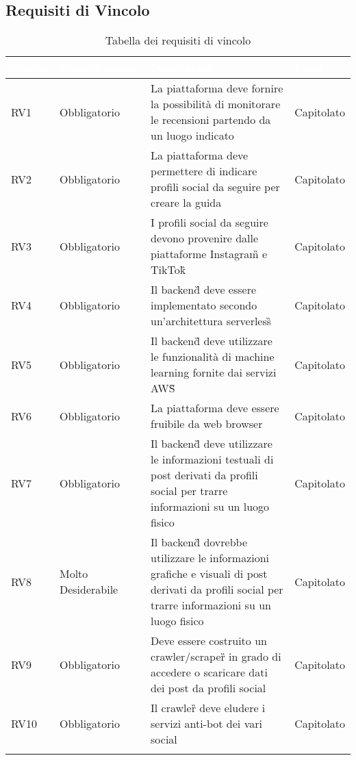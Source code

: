 \subsection{Requisiti di Vincolo}
{
      \setlength{\freewidth}{\dimexpr\textwidth-10\tabcolsep}
      \renewcommand{\arraystretch}{1.5}
      \centering
      \setlength{\aboverulesep}{0pt}
      \setlength{\belowrulesep}{0pt}
      \begin{longtable}{C{.15\freewidth} C{.2\freewidth} C{.528\freewidth} C{.15\freewidth}}
         \toprule
      \textcolor{white}{\textbf{Codice}}&
      \textcolor{white}{\textbf{Classificazione}}&
      \textcolor{white}{\textbf{Descrizione}}&
      \textcolor{white}{\textbf{Fonti}}\\	
      \toprule
      \endhead
      
      RV1 & Obbligatorio & La piattaforma deve fornire la possibilità di monitorare le recensioni partendo da un luogo indicato & Capitolato \\
      RV2 & Obbligatorio & La piattaforma deve permettere di indicare profili social da seguire per creare la guida & Capitolato \\
      RV3 & Obbligatorio & I profili social da seguire devono provenire dalle piattaforme Instagram\G{} e TikTok\G{} & Capitolato \\
      RV4 & Obbligatorio & Il backend\G{} deve essere implementato secondo un'architettura serverless\G{} & Capitolato \\
      RV5 & Obbligatorio & Il backend\G{} deve utilizzare le funzionalità di machine learning fornite dai servizi AWS\G{} & Capitolato \\
      RV6 & Obbligatorio & La piattaforma deve essere fruibile da web browser & Capitolato \\
      RV7 & Obbligatorio & Il backend\G{} deve utilizzare le informazioni testuali di post derivati da profili social per trarre informazioni su un luogo fisico & Capitolato \\
      RV8 & Molto Desiderabile & Il backend\G{} dovrebbe utilizzare le informazioni grafiche e visuali di post derivati da profili social per trarre informazioni su un luogo fisico & Capitolato \\
      RV9 & Obbligatorio & Deve essere costruito un crawler/scraper\G{} in grado di accedere o scaricare dati dei post da profili social & Capitolato \\
      RV10 & Obbligatorio & Il crawler\G{} deve eludere i servizi anti-bot dei vari social & Capitolato \\
      \bottomrule
      \caption{Tabella dei requisiti di vincolo}
      \end{longtable}
}
